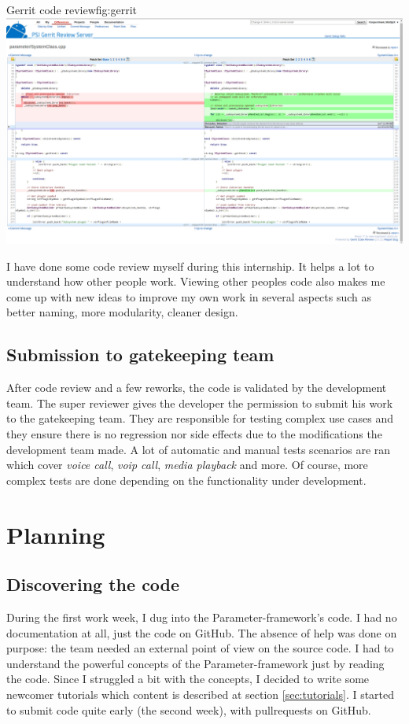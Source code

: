 \begin{figureGraphics}{Gerrit code review}{fig:gerrit}
    \includegraphics[width=\textwidth]{./src/img/gerrit.png}
\end{figureGraphics}

I have done some code review myself during this internship. It helps a lot to
understand how other people work. Viewing other peoples code also makes me come
up with new ideas to improve my own work in several aspects such as better naming,
more modularity, cleaner design.

\subsection{Submission to gatekeeping team}\label{sec:gatekeeping}
After code review and a few reworks, the code is validated by the development team.
The super reviewer gives the developer the permission to submit his work to the gatekeeping team.
They are responsible for testing complex use cases and they ensure there is no regression nor side effects
due to the modifications the development team made.
A lot of automatic and manual tests scenarios are ran which cover \emph{voice call}, \emph{voip call}, \emph{media playback}
and more. Of course, more complex tests are done depending on the functionality under development.



\section{Planning}
\subsection{Discovering the code}
During the first work week, I dug into the Parameter-framework's code. I had no
documentation at all, just the code on \gls{GitHub}. The absence of help was done on
purpose: the team needed an external point of view on the source code. I had
to understand the powerful concepts of the Parameter-framework just by reading
the code. Since I struggled a bit with the concepts, I decided to write some
newcomer tutorials which content is described at section \ref{sec:tutorials}.
I started to submit code quite early (the second week), with \gls{pullrequests} on \gls{GitHub}.


